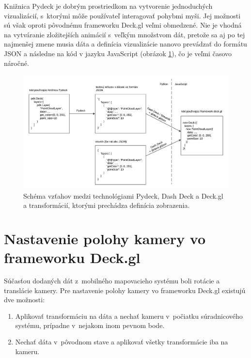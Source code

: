 Knižnica Pydeck je dobrým prostriedkom na vytvorenie jednoduchých vizualizácií, s~ktorými môže používateľ interagovať pohybmi myši. Jej možnosti sú však oproti pôvodnému frameworku Deck.gl veľmi obmedzené. Nie je vhodná na vytváranie zložitejších animácií s~veľkým množstvom dát, pretože sa aj po tej najmenšej zmene musia dáta a definícia vizualizácie nanovo prevádzať do formátu JSON a následne na kód v jazyku JavaScript (obrázok \ref{fig:pydeck_dashdeck_schema}), čo je veľmi časovo náročné.

\begin{figure}[h]
    \centering
    \includegraphics[width=1\linewidth]{text_prace/obrazky-figures/pydeck_dashdeck_transformacie.pdf}
    \caption[Schéma vzťahov medzi technológiami Pydeck, Dash Deck a Deck.gl.]{Schéma vzťahov medzi technológiami Pydeck, Dash Deck a Deck.gl a transformácií, ktorými prechádza definícia zobrazenia.}
    \label{fig:pydeck_dashdeck_schema}
\end{figure}

\section{Nastavenie polohy kamery vo frameworku Deck.gl}
\label{sec:nastavenie_polohy_kamery}

Súčasťou dodaných dát z~mobilného mapovacieho systému boli rotácie a translácie kamery. Pre nastavenie polohy kamery vo frameworku Deck.gl existujú dve možnosti:

\begin{enumerate}
    \item Aplikovať transformáciu na dáta a nechať kameru v~počiatku súradnicového systému, prípadne v~nejakom inom pevnom bode.
    \item Nechať dáta v~pôvodnom stave a aplikovať všetky transformácie iba na kameru.
\end{enumerate}

